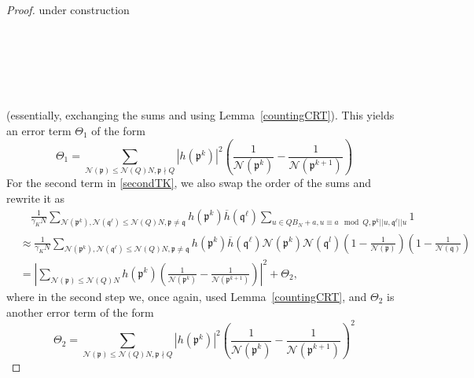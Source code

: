 \documentclass[11pt]{amsart}
\theoremstyle{definition}
\newcommand{\NN}{{\mathcal N}}
\newcommand{\Z}{{\mathbb Z}}
\newcommand{\mf}{\mathfrak}
\begin{document}
\begin{proof}
{\color{red} under construction}

\

\

\


(essentially, exchanging the sums and using Lemma~\ref{countingCRT}). This yields an error term $\Theta_1$ of the form
\[
\Theta_1=\sum_{\NN(\mf p) \leq \NN(Q)N, \mf p \nmid Q} |h(\mf p^k)|^2 \left( \frac{1}{\NN(\mf p^k)}-\frac{1}{\NN(\mf p^{k+1})}\right)
\]
For the second term in \eqref{secondTK}, we also swap the order of the sums and rewrite it as
\begin{equation}
    \begin{split}
        &\quad \frac{1}{\gamma_{K} N}\sum_{\NN(\mf p^{k}),\NN(\mf q^{\ell}) \leq \NN(Q)N, \mf p\neq \mf q} h(\mf p^{k})\overline{h}(\mf q^{\ell})\sum_{u\in QB_N+a, u\equiv a \mod Q, \mf p^{k}||u, \mf q^{\ell}||u}1
        \\&\approx \frac{1}{\gamma_{K} N}\sum_{\NN(\mf p^{k}),\NN(\mf q^{\ell})\leq \NN(Q)N, \mf p\neq \mf q} h(\mf p^{k})\overline{h}(\mf q^{\ell})\NN(\mf p^k)\NN(\mf q^l)\left(1-\frac{1}{\NN(\mf p)}\right) \left(1-\frac{1}{\NN(\mf q)}\right)
        \\&= \left|\sum_{\NN(\mf p) \leq \NN(Q)N} h(\mf p^{k})\left( \frac{1}{\NN(\mf p^k)}-\frac{1}{\NN(\mf p^{k+1})}\right)\right|^2+\Theta_2,
    \end{split}
\end{equation}
where in the second step we, once again, used Lemma~\ref{countingCRT}, and $\Theta_2$ is another error term of the form
\[
\Theta_2=\sum_{\NN(\mf p) \leq \NN(Q)N, \mf p \nmid Q} |h(\mf p^k)|^2 \left( \frac{1}{\NN(\mf p^k)}-\frac{1}{\NN(\mf p^{k+1})}\right)^2
\]
\end{proof}
\end{document}
